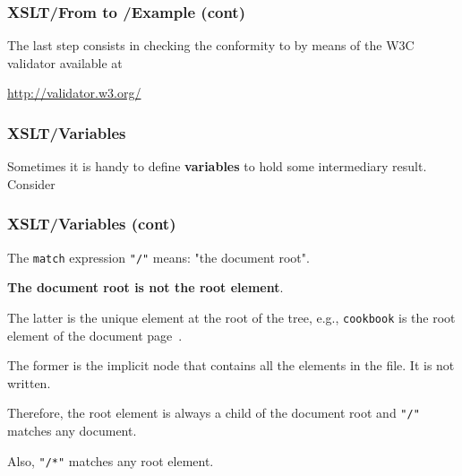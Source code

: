 %
\begin{frame}
\frametitle{XSLT/From \XML to \XHTML{}/Example (cont)}

The last step consists in checking the conformity to \XHTML by means
of the W3C validator available at
\begin{center}
\url{http://validator.w3.org/}
\end{center}

\end{frame}

%
\begin{frame}
\frametitle{XSLT/Variables}

Sometimes it is handy to define \textbf{variables} to hold some
intermediary result. Consider 

\end{frame}

%
\begin{frame}[containsverbatim]
\frametitle{XSLT/Variables (cont)}

The \texttt{match} expression \verb|"/"| means: "the document
root". 
\begin{center}
\textbf{The document root is not the root element}.
\end{center}
The latter is the unique element at the root of the \XML tree, e.g.,
\texttt{cookbook} is the root element of the document
page~\pageref{cookbook.xml}.

\bigskip

The former is the implicit node that contains all the elements in the
\XSLT file. It is not written.

\bigskip

Therefore, the root element is always a child of the document root and
\verb|"/"| matches any \XML document.

\bigskip

Also, \verb|"/*"| matches any root element.

\end{frame}

